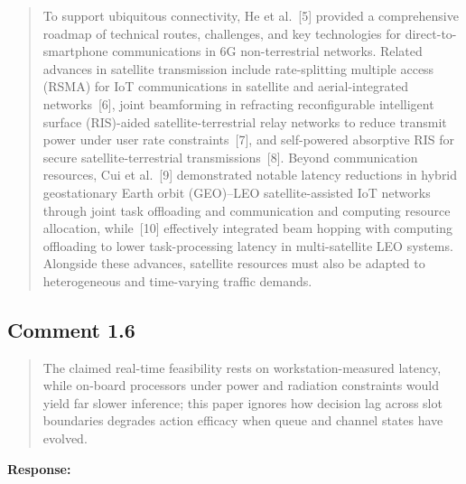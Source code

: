 \documentclass[11pt,a4paper]{article}
\begin{document}

\begin{quote}\small\color{revisionblue}
To support ubiquitous connectivity, He et al.~[5] provided a comprehensive roadmap of technical routes, challenges, and key technologies for direct-to-smartphone communications in 6G non-terrestrial networks. Related advances in satellite transmission include rate-splitting multiple access (RSMA) for IoT communications in satellite and aerial-integrated networks~[6], joint beamforming in refracting reconfigurable intelligent surface (RIS)-aided satellite-terrestrial relay networks to reduce transmit power under user rate constraints~[7], and self-powered absorptive RIS for secure satellite-terrestrial transmissions~[8]. Beyond communication resources, Cui et al.~[9] demonstrated notable latency reductions in hybrid geostationary Earth orbit (GEO)--LEO satellite-assisted IoT networks through joint task offloading and communication and computing resource allocation, while~[10] effectively integrated beam hopping with computing offloading to lower task-processing latency in multi-satellite LEO systems. Alongside these advances, satellite resources must also be adapted to heterogeneous and time-varying traffic demands.
\par
\end{quote}


\subsection*{Comment 1.6}

\begin{quote}\small The claimed real-time feasibility rests on workstation-measured latency, while on-board processors under power and radiation constraints would yield far slower inference; this paper ignores how decision lag across slot boundaries degrades action efficacy when queue and channel states have evolved.\end{quote}

\textbf{Response:}\par
\end{document}
